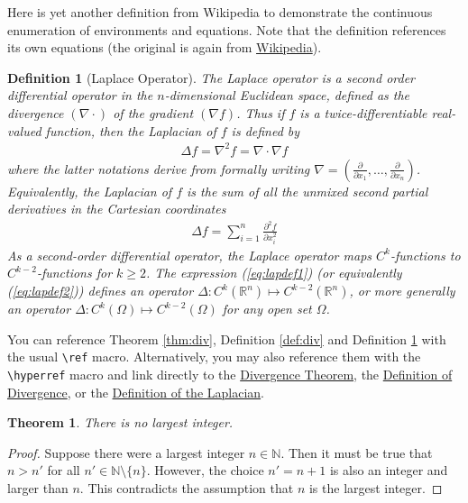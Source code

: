 \documentclass[10pt]{article}
\newtheorem{theorem}{Theorem}
\newtheorem{definition}{Definition}
\begin{document}
Here is yet another definition from Wikipedia to demonstrate the
continuous enumeration of environments and equations. Note that the definition
references its own equations (the original is again from
\href{http://en.wikipedia.org/wiki/Laplace_operator}{Wikipedia}).
\begin{definition}[Laplace Operator]
  \label{def:lap}
  The Laplace operator is a second order differential operator in the
  $n$-dimensional Euclidean space, defined as the divergence
  $(\nabla\cdot)$ of the gradient $(\nabla f)$. Thus if $f$ is a
  twice-differentiable real-valued function, then the Laplacian of $f$
  is defined by
  \begin{align}
    \label{eq:lapdef1}
    \Delta f = \nabla^2f = \nabla\cdot\nabla f
  \end{align}
  where the latter notations derive from formally writing $\nabla =
  \left(\frac{\partial}{\partial x_1}, \ldots,
    \frac{\partial}{\partial x_n}\right)$. Equivalently, the Laplacian
  of $f$ is the sum of all the unmixed second partial derivatives in the
  Cartesian coordinates
  \begin{align}
    \label{eq:lapdef2}
    \Delta f = \sum_{i=1}^n \frac{\partial^2f}{\partial x_i^2}
  \end{align}
  As a second-order differential operator, the Laplace operator maps
  $C^k$-functions to $C^{k-2}$-functions for $k\geq 2$. The expression
  (\ref{eq:lapdef1}) (or equivalently (\ref{eq:lapdef2})) defines an
  operator $\Delta : C^k(\mathbb{R}^n) \mapsto
  C^{k-2}(\mathbb{R}^n)$, or more generally an operator $\Delta :
  C^k(\Omega) \mapsto C^{k-2}(\Omega)$ for any open set $\Omega$.
\end{definition}

You can reference Theorem \ref{thm:div}, Definition
\ref{def:div} and Definition \ref{def:lap} with the usual
\texttt{\textbackslash{ref}} macro. Alternatively,
you may also reference them with the \texttt{\textbackslash{hyperref}}
macro and link directly to the \hyperref[thm:div]{Divergence Theorem},
the \hyperref[def:div]{Definition of Divergence}, or the
\hyperref[def:div]{Definition of the Laplacian}.

\begin{theorem}
  \label{thm:no_largest_int}
  There is no largest integer.
\end{theorem}
\begin{proof}
  Suppose there were a largest integer $n\in\mathbb{N}$. Then it must
  be true that $n > n'$ for all $n'\in\mathbb{N}\setminus\{n\}$. However,
  the choice $n' = n + 1$ is also an integer and larger than $n$. This
  contradicts the assumption that $n$ is the largest integer.
\end{proof}
\end{document}
